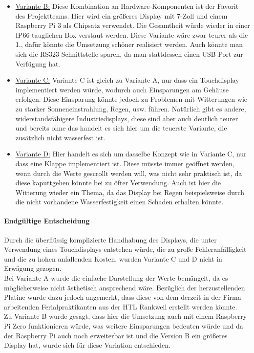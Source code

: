 \begin{itemize}
	\item \underline{Variante B:} Diese Kombination an Hardware-Komponenten ist der Favorit des Projektteams. Hier wird ein größeres Display mit 7-Zoll und einem Raspberry Pi 3 als Chipsatz verwendet. Die Gesamtheit würde wieder in einer IP66-tauglichen Box verstaut werden. Diese Variante wäre zwar teurer als die 1., dafür könnte die Umsetzung schöner realisiert werden. Auch könnte man sich die RS323-Schnittstelle sparen, da man stattdessen einen USB-Port zur Verfügung hat.
	\item \underline{Variante C:} Variante C ist gleich zu Variante A, nur dass ein Touchdisplay implementiert werden würde, wodurch auch Einsparungen am Gehäuse erfolgen. Diese Einsparung könnte jedoch zu Problemen mit Witterungen wie zu starker Sonneneinstrahlung, Regen, usw. führen. Natürlich gibt es andere, widerstandsfähigere Industriedisplays, diese sind aber auch deutlich teurer und bereits ohne das handelt es sich hier um die teuerste Variante, die zusätzlich nicht wasserfest ist.
	\item \underline{Variante D:} Hier handelt es sich um dasselbe Konzept wie in Variante C, nur dass eine Klappe implementiert ist. Diese müsste immer geöffnet werden, wenn durch die Werte gescrollt werden will, was nicht sehr praktisch ist, da diese kaputtgehen könnte bei zu öfter Verwendung. Auch ist hier die Witterung wieder ein Thema, da das Display bei Regen beispielsweise durch die nicht vorhandene Wasserfestigkeit einen Schaden erhalten könnte.
\end{itemize}

\paragraph{Endgültige Entscheidung}
Durch die überflüssig komplizierte Handhabung des Displays, die unter Verwendung eines Touchdisplays entstehen würde, die zu große Fehleranfälligkeit und die zu hohen anfallenden Kosten, wurden Variante C und D nicht in Erwägung gezogen. \\
Bei Variante A wurde die einfache Darstellung der Werte bemängelt, da es möglicherweise nicht ästhetisch ansprechend wäre. Bezüglich der herzustellenden Platine wurde dazu jedoch angemerkt, dass diese von dem derzeit in der Firma arbeitenden Ferialpraktikanten aus der HTL Rankweil erstellt werden könnte. \\
Zu Variante B wurde gesagt, dass hier die Umsetzung auch mit einem Raspberry Pi Zero funktionieren würde, was weitere Einsparungen bedeuten würde und da der Raspberry Pi auch noch erweiterbar ist und die Version B ein größeres Display hat, wurde sich für diese Variation entschieden.